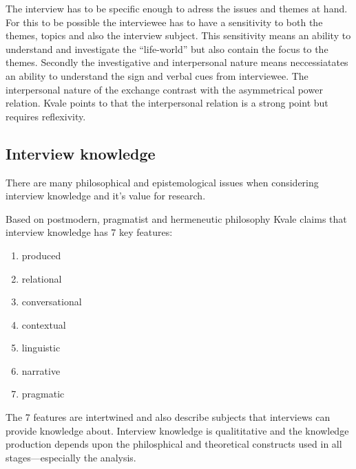 \documentclass[11pt,UKenglish, a4paper]{article}
\begin{document}
The interview has to be specific enough to adress the issues and themes at hand. For this to be possible the interviewee has to have a sensitivity to both the themes, topics and also the interview subject. This sensitivity means an ability to understand and investigate the ``life-world'' but also contain the focus to the themes. Secondly the investigative and interpersonal nature means neccessiatates an ability to understand the sign and verbal cues from interviewee. The interpersonal nature of the exchange contrast with the asymmetrical power relation. Kvale points to that the interpersonal relation is a strong point but requires reflexivity\cite[p.178]{Kvale1983Qualitative}.

\subsection{Interview knowledge}
There are many philosophical and epistemological issues when considering interview knowledge and it's value for research. 

Based on postmodern, pragmatist and hermeneutic philosophy Kvale claims that interview knowledge has 7 key features:
\begin{enumerate}[label=\bfseries\arabic*]
\item{produced}
\item{relational}
\item{conversational}
\item{contextual}
\item{linguistic}
\item{narrative}
\item{pragmatic}
\cite[p.53]{Kvale2009Interviews}
\end{enumerate}
The 7 features are intertwined and also describe subjects that interviews can provide knowledge about\cite[p.53]{Kvale2009Interviews}. Interview knowledge is qualititative and the knowledge production depends upon the philosphical and theoretical constructs used in all stages---especially the analysis. 

\printbibliography
\end{document}
